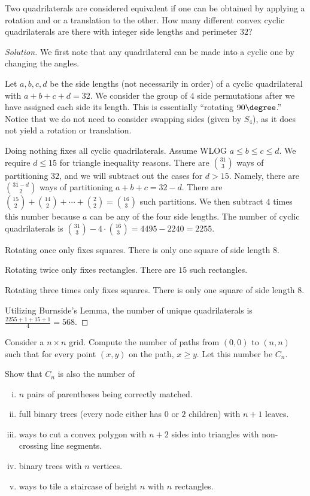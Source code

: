 \begin{prb}[2010 AMC 12A-25]
Two quadrilaterals are considered equivalent if one can be obtained by applying
a rotation and or a translation to the other. How many different convex cyclic
quadrilaterals are there with integer side lengths and perimeter $32$?
\end{prb}

\ifsolutions
\begin{proof}[Solution]
We first note that any quadrilateral can be made into a cyclic one by changing
the angles.

Let $a, b, c, d$ be the side lengths (not necessarily in order) of a cyclic
quadrilateral with $a + b + c + d = 32$. We consider the group of $4$ side
permutations after we have assigned each side its length. This is essentially
``rotating $90 \degree$.'' Notice that we do not need to consider swapping
sides (given by $S_4$), as it does not yield a rotation or translation.

Doing nothing fixes all cyclic quadrilaterals. Assume WLOG $a \leq b \leq c \leq
d$. We require $d \leq 15$ for triangle inequality reasons. There are
$\binom{31}{3}$ ways of partitioning $32$, and we will subtract out the cases
for $d > 15$. Namely, there are $\binom{31 - d}{2}$ ways of partitioning $a + b
+ c = 32 - d$. There are $\binom{15}{2} + \binom{14}{2} + \cdots + \binom{2}{2}
= \binom{16}{3}$ such partitions. We then subtract $4$ times this number because
$a$ can be any of the four side lengths. The number of cyclic quadrilaterals is
$\binom{31}{3} - 4 \cdot \binom{16}{3} = 4495 - 2240 = 2255$.

Rotating once only fixes squares. There is only one square of side length $8$.

Rotating twice only fixes rectangles. There are $15$ such rectangles.

Rotating three times only fixes squares. There is only one square of side length
$8$.

Utilizing Burnside's Lemma, the number of unique quadrilaterals is $\frac{2255 +
1 + 15 + 1}{4} = \boxed{568}$.
\end{proof}
\fi

\begin{prb}
Consider a $n \times n$ grid. Compute the number of paths from $(0, 0)$ to $(n,
n)$ such that for every point $(x, y)$ on the path, $x \geq y$. Let this number
be $C_n$.

Show that $C_n$ is also the number of
\begin{enumerate}[(i)]
\item
$n$ pairs of parentheses being correctly matched.
\item
full binary trees (every node either has $0$ or $2$ children) with $n + 1$
leaves.
\item
ways to cut a convex polygon with $n + 2$ sides into triangles with non-crossing
line segments.
\item
binary trees with $n$ vertices.
\item
ways to tile a staircase of height $n$ with $n$ rectangles.
\end{enumerate}
\end{prb}

